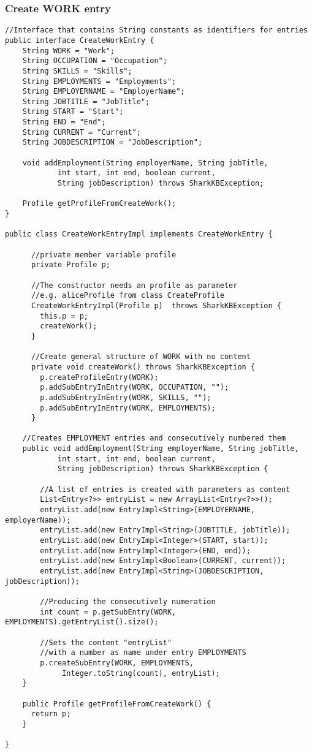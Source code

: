 \documentclass[12pt]{article}
\begin{document}
\subsubsection{Create WORK entry}
\begin{verbatim}
//Interface that contains String constants as identifiers for entries
public interface CreateWorkEntry {
    String WORK = "Work";
    String OCCUPATION = "Occupation";
    String SKILLS = "Skills";
    String EMPLOYMENTS = "Employments";
    String EMPLOYERNAME = "EmployerName";
    String JOBTITLE = "JobTitle";
    String START = "Start";
    String END = "End";
    String CURRENT = "Current";
    String JOBDESCRIPTION = "JobDescription";
    
    void addEmployment(String employerName, String jobTitle,
            int start, int end, boolean current,
            String jobDescription) throws SharkKBException;

    Profile getProfileFromCreateWork();
}

public class CreateWorkEntryImpl implements CreateWorkEntry {
	
      //private member variable profile
      private Profile p;

      //The constructor needs an profile as parameter
      //e.g. aliceProfile from class CreateProfile
      CreateWorkEntryImpl(Profile p)  throws SharkKBException {
        this.p = p;
        createWork();
      }

      //Create general structure of WORK with no content
      private void createWork() throws SharkKBException {
        p.createProfileEntry(WORK);
        p.addSubEntryInEntry(WORK, OCCUPATION, "");
        p.addSubEntryInEntry(WORK, SKILLS, "");
        p.addSubEntryInEntry(WORK, EMPLOYMENTS);
      }

    //Creates EMPLOYMENT entries and consecutively numbered them
    public void addEmployment(String employerName, String jobTitle,
            int start, int end, boolean current,
            String jobDescription) throws SharkKBException {

        //A list of entries is created with parameters as content
        List<Entry<?>> entryList = new ArrayList<Entry<?>>();
        entryList.add(new EntryImpl<String>(EMPLOYERNAME, employerName));
        entryList.add(new EntryImpl<String>(JOBTITLE, jobTitle));
        entryList.add(new EntryImpl<Integer>(START, start));
        entryList.add(new EntryImpl<Integer>(END, end));
        entryList.add(new EntryImpl<Boolean>(CURRENT, current));
        entryList.add(new EntryImpl<String>(JOBDESCRIPTION, jobDescription));

        //Producing the consecutively numeration 
        int count = p.getSubEntry(WORK, EMPLOYMENTS).getEntryList().size();

        //Sets the content "entryList"
        //with a number as name under entry EMPLOYMENTS 
        p.createSubEntry(WORK, EMPLOYMENTS,
             Integer.toString(count), entryList);
    }

    public Profile getProfileFromCreateWork() {
      return p;
    }
      
}
\end{verbatim}
\end{document}
